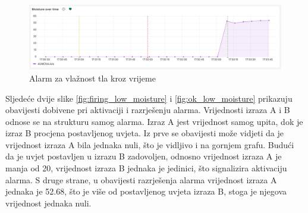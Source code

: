 \begin{figure}[ht]
	\centering
	\includegraphics[scale=0.35]{imgs/moisture_alert}
	\caption{Alarm za vlažnost tla kroz vrijeme}
	\label{fig:moisture_alert}
\end{figure}

Sljedeće dvije slike \ref{fig:firing_low_moisture} i \ref{fig:ok_low_moisture} prikazuju obavijesti dobivene pri aktivaciji i razrješenju alarma. Vrijednosti izraza A i B odnose se na strukturu samog alarma. Izraz A jest vrijednost samog upita, dok je izraz B procjena postavljenog uvjeta. Iz prve se obavijesti može vidjeti da je vrijednost izraza A bila jednaka nuli, što je vidljivo i na gornjem grafu. Budući da je uvjet postavljen u izrazu B zadovoljen, odnosno vrijednost izraza A je manja od 20, vrijednost izraza B jednaka je jedinici, što signalizira aktivaciju alarma. S druge strane, u obavijesti razrješenja alarma vrijednost izraza A jednaka je 52.68, što je više od postavljenog uvjeta izraza B, stoga je njegova vrijednost jednaka nuli. 


